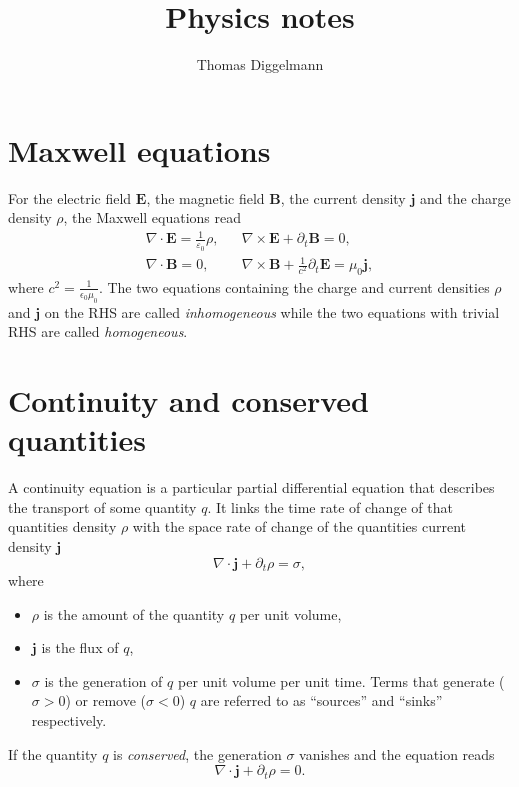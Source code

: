 \documentclass[a4paper, 11pt]{scrartcl}
\title{Physics notes}
\author{Thomas Diggelmann}
\renewcommand{\vec}[1]{\bm{#1}}
\begin{document}
\maketitle

\section*{Maxwell equations}

For the electric field $\vec{E}$, the magnetic field $\vec{B}$, the current density $\vec{j}$ and the charge density $\rho$, the Maxwell equations read
%
\begin{align*}
  \nabla\cdot\vec{E} = \frac{1}{\varepsilon_0}\rho, && \nabla\times\vec{E}+\partial_t\vec{B}=0, \\
  \nabla\cdot\vec{B} = 0,
  && \nabla\times\vec{B}+\frac{1}{c^2}\partial_t\vec{E}=\mu_0\vec{j},
\end{align*}
%
where $c^2 = \frac{1}{\epsilon_0\mu_0}$. The two equations containing the charge and current densities $\rho$ and $\vec{j}$ on the RHS are called \emph{inhomogeneous} while the two equations with trivial RHS are called \emph{homogeneous}.

\section*{Continuity and conserved quantities}

A continuity equation is a particular partial differential equation that describes the transport of some quantity $q$. It links the time rate of change of that quantities density $\rho$ with the space rate of change of the quantities current density $\vec{j}$
\begin{equation*}
    \nabla\cdot\vec{j}+\partial_t\rho=\sigma,
\end{equation*}
where
\begin{itemize}
  \item $\rho$ is the amount of the quantity $q$ per unit volume,
  \item $\vec{j}$ is the flux of $q$,
  \item $\sigma$ is the generation of $q$ per unit volume per unit time. Terms that generate ($\sigma > 0$) or remove ($\sigma < 0$) $q$ are referred to as ``sources'' and ``sinks'' respectively.
\end{itemize}
%
If the quantity $q$ is \emph{conserved}, the generation $\sigma$ vanishes and the equation reads
\begin{equation*}
    \nabla\cdot\vec{j}+\partial_t\rho=0.
\end{equation*}
\end{document}
